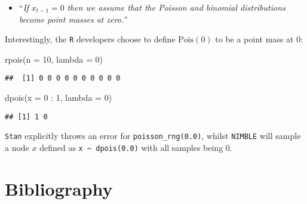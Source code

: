 \documentclass[
  10pt,
  a4paper,
]{article}
\newenvironment{Shaded}{\begin{snugshade}}{\end{snugshade}}
\newcommand{\AttributeTok}[1]{\textcolor[rgb]{0.77,0.63,0.00}{#1}}
\newcommand{\DecValTok}[1]{\textcolor[rgb]{0.00,0.00,0.81}{#1}}
\newcommand{\FunctionTok}[1]{\textcolor[rgb]{0.00,0.00,0.00}{#1}}
\newcommand{\NormalTok}[1]{#1}
\newcommand{\SpecialCharTok}[1]{\textcolor[rgb]{0.00,0.00,0.00}{#1}}
\providecommand{\tightlist}{%
  \setlength{\itemsep}{0pt}\setlength{\parskip}{0pt}}
\begin{document}
\begin{itemize}
\tightlist
\item
  ``\emph{If} \(x_{t - 1} = 0\) \emph{then we assume that the Poisson
  and binomial distributions become point masses at zero.}''
\end{itemize}

Interestingly, the \texttt{R} developers choose to define
\(\text{Pois}(0)\) to be a point mass at \(0\):

\begin{Shaded}
\begin{Highlighting}[]
\FunctionTok{rpois}\NormalTok{(}\AttributeTok{n =} \DecValTok{10}\NormalTok{, }\AttributeTok{lambda =} \DecValTok{0}\NormalTok{)}
\end{Highlighting}
\end{Shaded}

\begin{verbatim}
##  [1] 0 0 0 0 0 0 0 0 0 0
\end{verbatim}

\begin{Shaded}
\begin{Highlighting}[]
\FunctionTok{dpois}\NormalTok{(}\AttributeTok{x =} \DecValTok{0} \SpecialCharTok{:} \DecValTok{1}\NormalTok{, }\AttributeTok{lambda =} \DecValTok{0}\NormalTok{)}
\end{Highlighting}
\end{Shaded}

\begin{verbatim}
## [1] 1 0
\end{verbatim}

\texttt{Stan} explicitly throws an error for \texttt{poisson\_rng(0.0)},
whilst \texttt{NIMBLE} will sample a node \(x\) defined as
\texttt{x\ \textasciitilde{}\ dpois(0.0)} with all samples being \(0\).

\hypertarget{bibliography}{%
\section*{Bibliography}\label{bibliography}}
\end{document}
